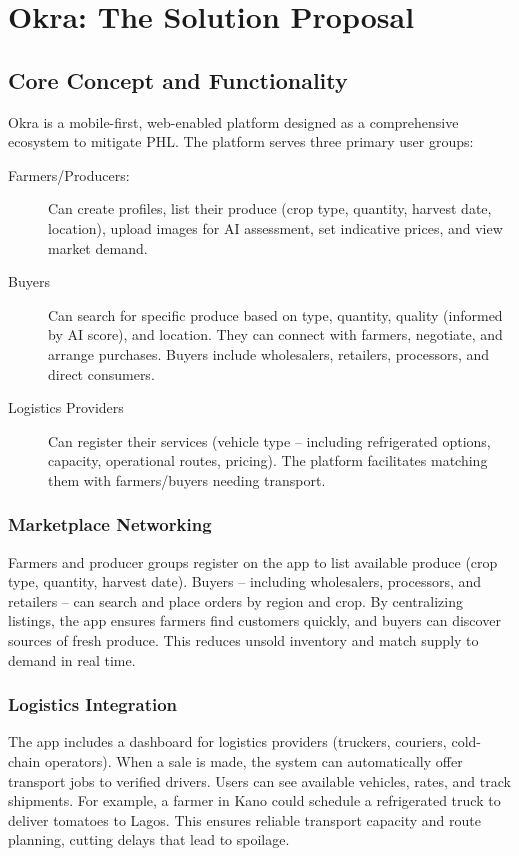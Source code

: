 \chapter[Okra: The Solution Proposal]{Okra: The Solution Proposal}
\label{cp:okra-solution}

{
\parindent0pt

\section{Core Concept and Functionality}
Okra is a mobile-first, web-enabled platform designed as a comprehensive ecosystem to mitigate PHL. The platform serves three primary user groups:

\begin{description}
    \item[Farmers/Producers:] Can create profiles, list their produce (crop type, quantity, harvest date, location), upload images for AI assessment, set indicative prices, and view market demand.
    
    \item[Buyers] Can search for specific produce based on type, quantity, quality (informed by AI score), and location. They can connect with farmers, negotiate, and arrange purchases. Buyers include wholesalers, retailers, processors, and direct consumers.
    
    \item[Logistics Providers] Can register their services (vehicle type – including refrigerated options, capacity, operational routes, pricing). The platform facilitates matching them with farmers/buyers needing transport.
\end{description}

\subsection{Marketplace Networking}
Farmers and producer groups register on the app to list available produce (crop type, quantity, harvest date). Buyers – including wholesalers, processors, and retailers – can search and place orders by region and crop. By centralizing listings, the app ensures farmers find customers quickly, and buyers can discover sources of fresh produce. This reduces unsold inventory and match supply to demand in real time.

\subsection{Logistics Integration}
The app includes a dashboard for logistics providers (truckers, couriers, cold-chain operators). When a sale is made, the system can automatically offer transport jobs to verified drivers. Users can see available vehicles, rates, and track shipments. For example, a farmer in Kano could schedule a refrigerated truck to deliver tomatoes to Lagos. This ensures reliable transport capacity and route planning, cutting delays that lead to spoilage.

}
